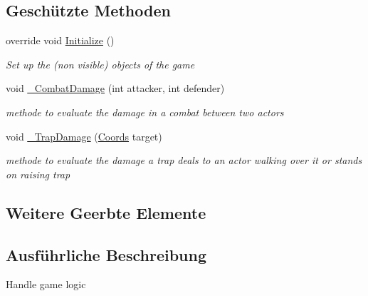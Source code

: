 \subsection*{Geschützte Methoden}
\begin{DoxyCompactItemize}
\item 
override void \hyperlink{class_gruppe22_1_1_backend_1_1_game_logic_afeba77d1e055f35a2abe58fcc849163d}{Initialize} ()
\begin{DoxyCompactList}\small\item\em Set up the (non visible) objects of the game \end{DoxyCompactList}\item 
void \hyperlink{class_gruppe22_1_1_backend_1_1_game_logic_a129959614d647372d87e8eb34e1c50a5}{\-\_\-\-Combat\-Damage} (int attacker, int defender)
\begin{DoxyCompactList}\small\item\em methode to evaluate the damage in a combat between two actors \end{DoxyCompactList}\item 
void \hyperlink{class_gruppe22_1_1_backend_1_1_game_logic_a7d29f64f2a93c336d262e017ef8d2f4b}{\-\_\-\-Trap\-Damage} (\hyperlink{class_gruppe22_1_1_backend_1_1_coords}{Coords} target)
\begin{DoxyCompactList}\small\item\em methode to evaluate the damage a trap deals to an actor walking over it or stands on raising trap \end{DoxyCompactList}\end{DoxyCompactItemize}
\subsection*{Weitere Geerbte Elemente}


\subsection{Ausführliche Beschreibung}
Handle game logic 



